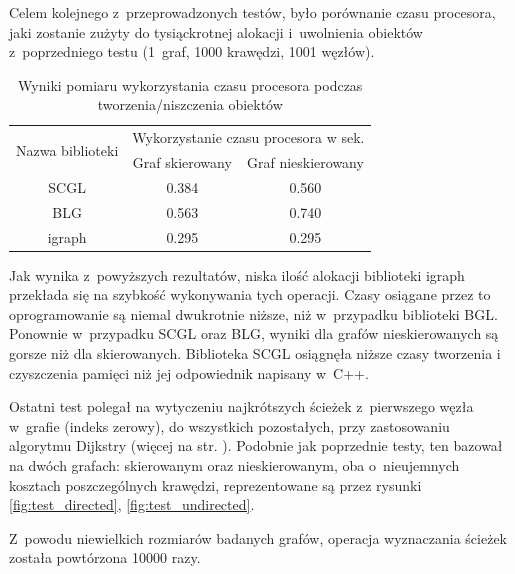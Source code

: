 \documentclass[a4paper,12pt,polish,oneside,openright]{thesis}
\begin{document}
Celem kolejnego z~przeprowadzonych testów, było porównanie czasu procesora, jaki zostanie zużyty do tysiąckrotnej alokacji i~uwolnienia obiektów z~poprzedniego testu (1~graf, 1000 krawędzi, 1001 węzłów).
\begin{table}[htb]
\caption{Wyniki pomiaru wykorzystania czasu procesora podczas tworzenia/niszczenia obiektów}
\label{tab:mem_speed}
\centering
\begin{tabular}{ | c | c | c | }
	\hline
	\multirow{2}{*}{Nazwa biblioteki } & \multicolumn{2}{|c|}{Wykorzystanie czasu procesora w sek.} \\
	\cline{2-3}
		& Graf skierowany & Graf nieskierowany \\
	\hline \hline
	SCGL    & 0.384 & 0.560 \\ \hline
	BLG     & 0.563 & 0.740 \\ \hline
	igraph  & 0.295 & 0.295 \\ \hline
\end{tabular}
\end{table}
Jak wynika z~powyższych rezultatów, niska ilość alokacji biblioteki igraph przekłada się na szybkość wykonywania tych operacji.
Czasy osiągane przez to oprogramowanie są niemal dwukrotnie niższe, niż w~przypadku biblioteki BGL.
Ponownie w~przypadku SCGL oraz BLG, wyniki dla grafów nieskierowanych są gorsze niż dla skierowanych.
Biblioteka SCGL osiągnęła niższe czasy tworzenia i czyszczenia pamięci niż jej odpowiednik napisany w~C++.

Ostatni test polegał na wytyczeniu najkrótszych ścieżek z~pierwszego węzła w~grafie (indeks zerowy), do wszystkich pozostałych, przy zastosowaniu algorytmu Dijkstry (więcej na str. \pageref{chap:dijkstra}).
Podobnie jak poprzednie testy, ten bazował na dwóch grafach: skierowanym oraz nieskierowanym, oba o~nieujemnych kosztach poszczególnych krawędzi, reprezentowane są przez rysunki \ref{fig:test_directed}, \ref{fig:test_undirected}.

Z~powodu niewielkich rozmiarów badanych grafów, operacja wyznaczania ścieżek została powtórzona 10000 razy.
\end{document}
